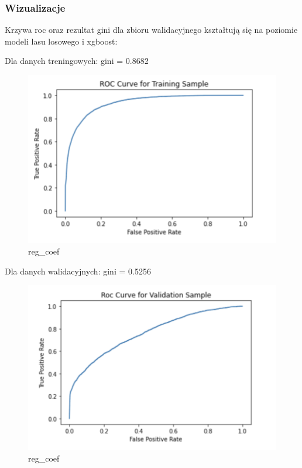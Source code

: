 \documentclass[11pt]{article}
\begin{document}
\hypertarget{wizualizacje}{%
\subsubsection{Wizualizacje}\label{wizualizacje}}

Krzywa roc oraz rezultat gini dla zbioru walidacyjnego kształtują się na
poziomie modeli lasu losowego i xgboost:

Dla danych treningowych: gini = 0.8682

\begin{figure}
\centering
\includegraphics{plots/voting_roc_train.png}
\caption{reg\_coef}
\end{figure}

Dla danych walidacyjnych: gini = 0.5256

\begin{figure}
\centering
\includegraphics{plots/voting_roc_val.png}
\caption{reg\_coef}
\end{figure}
\end{document}
